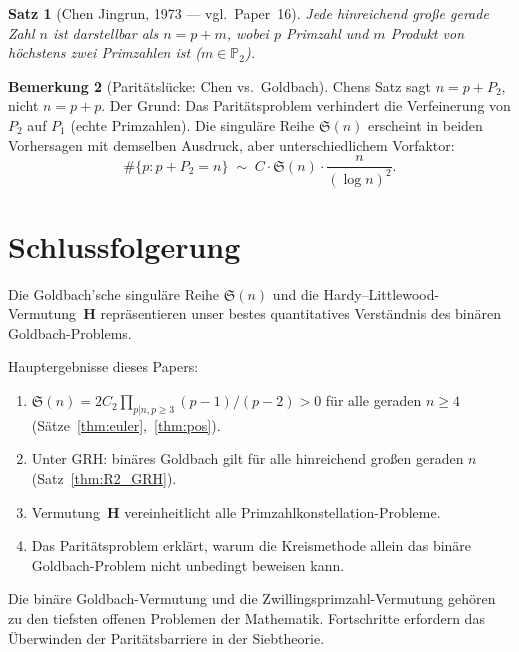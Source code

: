 \documentclass[12pt,a4paper]{amsart}
\newtheorem{theorem}{Satz}[section]
\theoremstyle{definition}
\newtheorem{bemerkung}[theorem]{Bemerkung}
\begin{document}
\begin{theorem}[Chen Jingrun, 1973 — vgl.\ Paper~16]\label{thm:chen}
  Jede hinreichend große gerade Zahl $n$ ist darstellbar als $n = p + m$,
  wobei $p$ Primzahl und $m$ Produkt von höchstens zwei Primzahlen ist
  ($m \in \mathbb{P}_2$).
\end{theorem}

\begin{bemerkung}[Paritätslücke: Chen vs.\ Goldbach]
  Chens Satz sagt $n = p + P_2$, nicht $n = p + p$.  Der Grund:
  Das Paritätsproblem verhindert die Verfeinerung von $P_2$ auf $P_1$
  (echte Primzahlen).  Die singuläre Reihe $\mathfrak{S}(n)$ erscheint
  in beiden Vorhersagen mit demselben Ausdruck, aber unterschiedlichem
  Vorfaktor:
  \[
    \#\{p : p + P_2 = n\} \;\sim\; C \cdot \mathfrak{S}(n) \cdot \frac{n}{(\log n)^2}.
  \]
\end{bemerkung}

\section{Schlussfolgerung}

Die Goldbach'sche singuläre Reihe $\mathfrak{S}(n)$ und die Hardy--Littlewood-Vermutung~$\mathbf{H}$
repräsentieren unser bestes quantitatives Verständnis des binären Goldbach-Problems.

Hauptergebnisse dieses Papers:
\begin{enumerate}
  \item $\mathfrak{S}(n) = 2C_2 \prod_{p|n, p\geq 3}(p-1)/(p-2) > 0$
    für alle geraden $n \geq 4$ (Sätze~\ref{thm:euler},~\ref{thm:pos}).
  \item Unter GRH: binäres Goldbach gilt für alle hinreichend großen
    geraden $n$ (Satz~\ref{thm:R2_GRH}).
  \item Vermutung~$\mathbf{H}$ vereinheitlicht alle Primzahlkonstellation-Probleme.
  \item Das Paritätsproblem erklärt, warum die Kreismethode allein das
    binäre Goldbach-Problem nicht unbedingt beweisen kann.
\end{enumerate}

Die binäre Goldbach-Vermutung und die Zwillingsprimzahl-Vermutung gehören
zu den tiefsten offenen Problemen der Mathematik.  Fortschritte erfordern
das Überwinden der Paritätsbarriere in der Siebtheorie.
\end{document}
